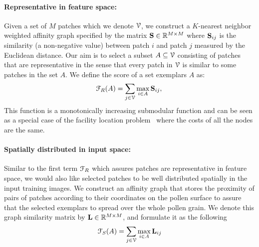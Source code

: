 \documentclass[10pt,twocolumn,letterpaper]{article}
\def\S{{\bf S}}
\def\RB{{\mathbb R}}
\begin{document}
\paragraph{Representative in feature space:}
Given a set of $M$ patches which we denote ${\cal V}$, we construct a
$K$-nearest neighbor weighted affinity graph specified by the matrix $\S \in
\RB^{M\times M}$ where $\S_{ij}$ is the similarity (a non-negative value)
between patch $i$ and patch $j$ measured by the Euclidean distance.  Our aim is to select a subset $A \subseteq
{\cal V}$ consisting of patches that are representative in the sense
that every patch in ${\cal V}$ is similar to some patches in the set $A$. We
define the score of a set exemplars $A$ as:
\begin{equation}
{\cal F}_{R}(A)  = \sum_{j \in {\cal V}} \max_{i\in A} {\bf S}_{ij}, \\
\label{eq:term1}
\end{equation}
This function is a monotonically increasing submodular function and can be seen
as a special case of the facility location
problem~\cite{cornuejols1983uncapacitated} where the costs of all the nodes are
the same.

\paragraph{Spatially distributed in input space:}
Similar to the first term ${\cal F}_{R}$ which assures patches are representative
in feature space, we would also like selected patches to be well distributed
spatially in the input training images.  We construct an affinity graph that
stores the proximity of pairs of patches according to their coordinates on the
pollen surface to assure that the selected exemplars to spread over the whole
pollen grain.  We denote this graph similarity matrix by ${\bf L} \in \RB^{M\times
M}$, and formulate it as the following
\begin{equation}
\begin{split}
{\cal F}_{S}(A) = \sum_{j \in {\cal V}} \max_{i\in A} {\bf L}_{ij}
\end{split}
\label{eq:term4}
\end{equation}
\end{document}
